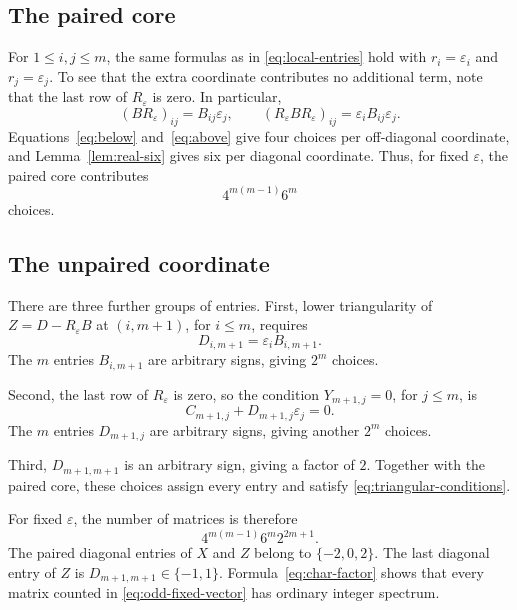 \documentclass[11pt]{amsart}
\theoremstyle{definition}
\theoremstyle{remark}
\numberwithin{equation}{section}
\begin{document}
\subsection{The paired core}

For $1\leq i,j\leq m$, the same formulas as in \eqref{eq:local-entries} hold with $r_i=\varepsilon_i$ and $r_j=\varepsilon_j$. To see that the extra coordinate contributes no additional term, note that the last row of $R_\varepsilon$ is zero. In particular,
\[
 (BR_\varepsilon)_{ij}=B_{ij}\varepsilon_j,
 \qquad
 (R_\varepsilon B R_\varepsilon)_{ij}
 =\varepsilon_i B_{ij}\varepsilon_j.
\]
Equations~\eqref{eq:below} and~\eqref{eq:above} give four choices per off-diagonal coordinate, and Lemma~\ref{lem:real-six} gives six per diagonal coordinate. Thus, for fixed $\varepsilon$, the paired core contributes
\begin{equation}\label{eq:odd-core}
 4^{m(m-1)}6^m
\end{equation}
choices.

\subsection{The unpaired coordinate}

There are three further groups of entries. First, lower triangularity of $Z=D-R_\varepsilon B$ at $(i,m+1)$, for $i\leq m$, requires
\begin{equation}\label{eq:odd-column}
 D_{i,m+1}=\varepsilon_i B_{i,m+1}.
\end{equation}
The $m$ entries $B_{i,m+1}$ are arbitrary signs, giving $2^m$ choices.

Second, the last row of $R_\varepsilon$ is zero, so the condition $Y_{m+1,j}=0$, for $j\leq m$, is
\begin{equation}\label{eq:odd-row}
 C_{m+1,j}+D_{m+1,j}\varepsilon_j=0.
\end{equation}
The $m$ entries $D_{m+1,j}$ are arbitrary signs, giving another $2^m$ choices.

Third, $D_{m+1,m+1}$ is an arbitrary sign, giving a factor of $2$. Together with the paired core, these choices assign every entry and satisfy \eqref{eq:triangular-conditions}.

For fixed $\varepsilon$, the number of matrices is therefore
\begin{equation}\label{eq:odd-fixed-vector}
 4^{m(m-1)}6^m2^{2m+1}.
\end{equation}
The paired diagonal entries of $X$ and $Z$ belong to $\{-2,0,2\}$. The last diagonal entry of $Z$ is $D_{m+1,m+1}\in\{-1,1\}$. Formula~\eqref{eq:char-factor} shows that every matrix counted in \eqref{eq:odd-fixed-vector} has ordinary integer spectrum.
\end{document}
